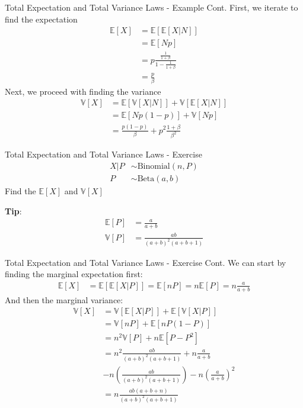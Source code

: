 \documentclass{beamer}
\begin{document}
\begin{frame}{Total Expectation and Total Variance Laws - Example Cont.}
First, we iterate to find the expectation
\begin{align*}
\mathbb{E}[X] &= \mathbb{E}[\mathbb{E}[X|N]]\\
&= \mathbb{E}[Np]\\
&= p\frac{\frac{1}{1+\beta}}{1-\frac{1}{1+\beta}}\\
&= \frac{p}{\beta}
\end{align*}
Next, we proceed with finding the variance
\begin{align*}
\mathbb{V}[X] &= \mathbb{E}[\mathbb{V}[X|N]] + \mathbb{V}[\mathbb{E}[X|N]] \\
&= \mathbb{E}[Np(1-p)] + \mathbb{V}[Np]\\
&= \frac{p(1-p)}{\beta} + p^{2}\frac{1+\beta}{\beta^{2}}
\end{align*}
\end{frame}

\begin{frame}{Total Expectation and Total Variance Laws - Exercise}
\begin{align*}
X|P&\sim\mathrm{Binomial}(n, P) \\
P &\sim\mathrm{Beta}(a, b)
\end{align*}
\newline
Find the $\mathbb{E}[X]$ and $\mathbb{V}[X]$

\textbf{Tip}:
\begin{align*}
\mathbb{E}[P] &= \frac{a}{a+b} \\
\mathbb{V}[P] &= \frac{ab}{(a+b)^{2}(a+b+1)}
\end{align*}
\end{frame}


\begin{frame}{Total Expectation and Total Variance Laws - Exercise Cont.}
We can start by finding the marginal expectation first:
\begin{align*}
\mathbb{E}[X] &= \mathbb{E}[\mathbb{E}[X|P]] = \mathbb{E}[nP] = n \mathbb{E}[P] = n \frac{a}{a+b}
\end{align*}
And then the marginal variance:
\begin{align*}
\mathbb{V}[X] &= \mathbb{V}[\mathbb{E}[X|P]] + \mathbb{E}[\mathbb{V}[X|P]]\\
&= \mathbb{V}[nP] + \mathbb{E}[nP(1-P)]\\
&= n^{2}\mathbb{V}[P] + n\mathbb{E}[P - P^{2}] \\
& = n^{2} \frac{ab}{(a+b)^{2}(a+b+1)} + n \frac{a}{a+b} \\ &- n (\frac{ab}{(a+b)^{2}(a+b+1)}) - n (\frac{a}{a+b})^{2}\\
& = n \frac{ab(a+b+n)}{(a+b)^{2}(a+b+1)}
\end{align*}
\end{frame}
\end{document}
